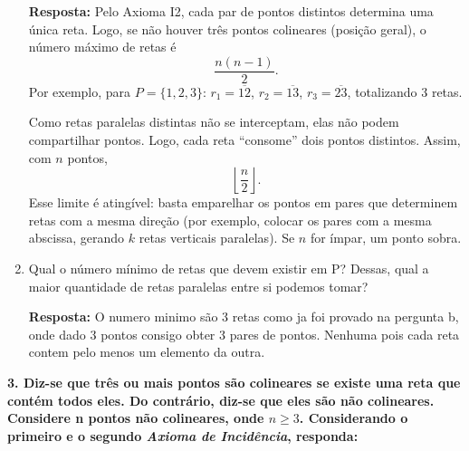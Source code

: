 \documentclass[12pt,a4paper]{article}
\begin{document}
\begin{enumerate}[label=\alph*)]
    \textbf{Resposta:} Pelo Axioma I2, cada par de pontos distintos determina uma única reta. 
    Logo, se não houver três pontos colineares (posição geral), o número máximo de retas é
    \[
    \frac{n(n-1)}{2}.
    \]
    Por exemplo, para $P=\{1,2,3\}$:
    $r_1=\overline{12}$, $r_2=\overline{13}$, $r_3=\overline{23}$, totalizando 3 retas.

    Como retas paralelas distintas não se interceptam, elas não podem compartilhar pontos.
    Logo, cada reta “consome” dois pontos distintos. Assim, com $n$ pontos,
    \[
    \left\lfloor \frac{n}{2} \right\rfloor .
    \]
    Esse limite é atingível: basta emparelhar os pontos em pares que determinem retas com a
    mesma direção (por exemplo, colocar os pares com a mesma abscissa, gerando $k$ retas
    verticais paralelas). Se $n$ for ímpar, um ponto sobra.


    \item Qual o número mínimo de retas que devem existir em P? Dessas, qual a maior quantidade de retas paralelas entre si podemos tomar?

    \textbf{Resposta:} 
    O numero minimo são 3 retas como ja foi provado na pergunta b, onde dado 3 pontos consigo obter 3 pares de pontos. Nenhuma pois cada reta contem pelo menos um elemento da outra.

\end{enumerate}

\vspace{0.8cm}

\textbf {3. Diz-se que três ou mais pontos são colineares se existe uma reta que contém todos eles. Do contrário, diz-se que eles são não colineares. Considere n pontos não colineares, onde $n \ge 3$. Considerando o primeiro e o segundo \textit{Axioma de Incidência}, responda:}

\vspace{0.4cm}
\end{document}
